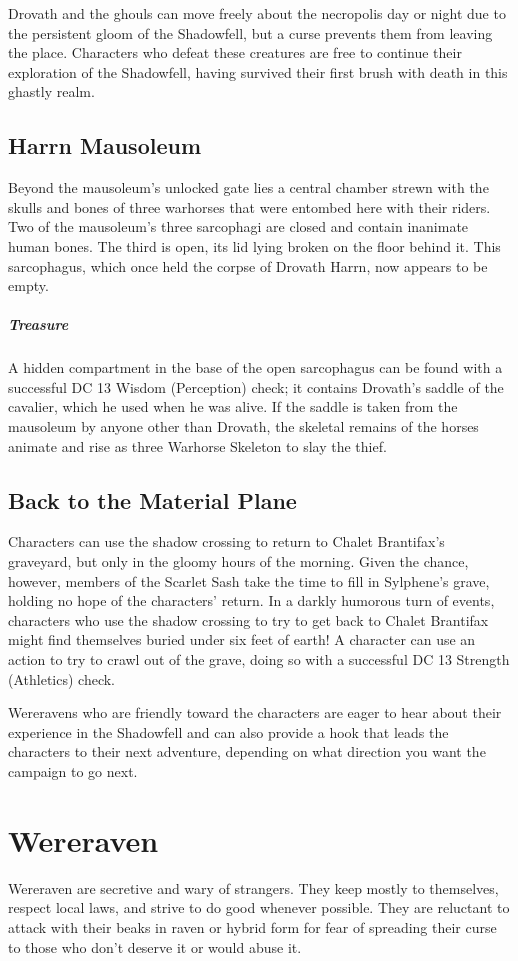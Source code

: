 \documentclass[10pt,a4paper,twoside,bg=print,twocolumn,openany,nodeprecatedcode]{dndbook}
\begin{document}
Drovath and the ghouls can move freely about the necropolis day or night due to the persistent gloom of the Shadowfell, but a curse prevents them from leaving the place. Characters who defeat these creatures are free to continue their exploration of the Shadowfell, having survived their first brush with death in this ghastly realm.

\subsection{Harrn Mausoleum}
Beyond the mausoleum's unlocked gate lies a central chamber strewn with the skulls and bones of three warhorses that were entombed here with their riders. Two of the mausoleum's three sarcophagi are closed and contain inanimate human bones. The third is open, its lid lying broken on the floor behind it. This sarcophagus, which once held the corpse of Drovath Harrn, now appears to be empty.

\subparagraph{Treasure}
A hidden compartment in the base of the open sarcophagus can be found with a successful DC 13 Wisdom (Perception) check; it contains Drovath's saddle of the cavalier, which he used when he was alive. If the saddle is taken from the mausoleum by anyone other than Drovath, the skeletal remains of the horses animate and rise as three Warhorse Skeleton to slay the thief.

\subsection{Back to the Material Plane}
Characters can use the shadow crossing to return to Chalet Brantifax's graveyard, but only in the gloomy hours of the morning. Given the chance, however, members of the Scarlet Sash take the time to fill in Sylphene's grave, holding no hope of the characters' return. In a darkly humorous turn of events, characters who use the shadow crossing to try to get back to Chalet Brantifax might find themselves buried under six feet of earth! A character can use an action to try to crawl out of the grave, doing so with a successful DC 13 Strength (Athletics) check.

Wereravens who are friendly toward the characters are eager to hear about their experience in the Shadowfell and can also provide a hook that leads the characters to their next adventure, depending on what direction you want the campaign to go next.

\section{Wereraven}
Wereraven are secretive and wary of strangers. They keep mostly to themselves, respect local laws, and strive to do good whenever possible. They are reluctant to attack with their beaks in raven or hybrid form for fear of spreading their curse to those who don't deserve it or would abuse it.
\end{document}
